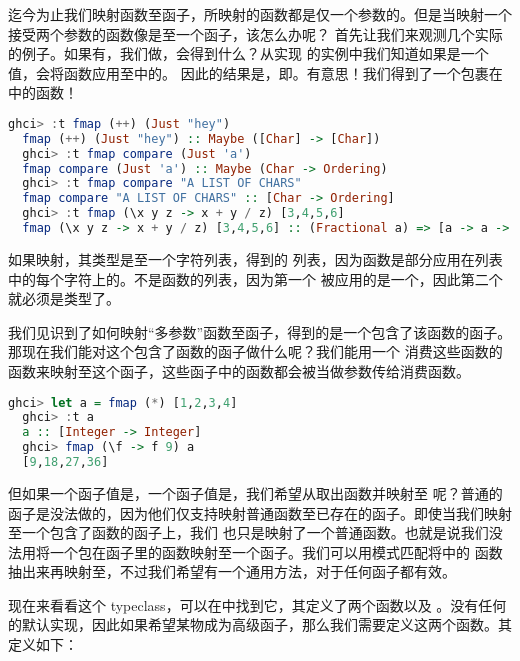 \documentclass[./main.tex]{subfiles}
\begin{document}
迄今为止我们映射函数至函子，所映射的函数都是仅一个参数的。但是当映射一个接受两个参数的函数像是\acode{*}至一个函子，该怎么办呢？
首先让我们来观测几个实际的例子。如果有，我们做，会得到什么？从实现
的实例中我们知道如果是一个值，会将函数应用至中的。
因此的结果是，即。有意思！我们得到了一个包裹在
中的函数！

\begin{lstlisting}[language=Haskell]
  ghci> :t fmap (++) (Just "hey")
  fmap (++) (Just "hey") :: Maybe ([Char] -> [Char])
  ghci> :t fmap compare (Just 'a')
  fmap compare (Just 'a') :: Maybe (Char -> Ordering)
  ghci> :t fmap compare "A LIST OF CHARS"
  fmap compare "A LIST OF CHARS" :: [Char -> Ordering]
  ghci> :t fmap (\x y z -> x + y / z) [3,4,5,6]
  fmap (\x y z -> x + y / z) [3,4,5,6] :: (Fractional a) => [a -> a -> a]
\end{lstlisting}

如果映射，其类型是至一个字符列表，得到的
列表，因为函数是部分应用在列表中的每个字符上的。不是函数的列表，因为第一个
被应用的是一个，因此第二个就必须是类型了。

我们见识到了如何映射“多参数”函数至函子，得到的是一个包含了该函数的函子。那现在我们能对这个包含了函数的函子做什么呢？我们能用一个
消费这些函数的函数来映射至这个函子，这些函子中的函数都会被当做参数传给消费函数。

\begin{lstlisting}[language=Haskell]
  ghci> let a = fmap (*) [1,2,3,4]
  ghci> :t a
  a :: [Integer -> Integer]
  ghci> fmap (\f -> f 9) a
  [9,18,27,36]
\end{lstlisting}

但如果一个函子值是，一个函子值是，我们希望从取出函数并映射至
呢？普通的函子是没法做的，因为他们仅支持映射普通函数至已存在的函子。即使当我们映射至一个包含了函数的函子上，我们
也只是映射了一个普通函数。也就是说我们没法用将一个包在函子里的函数映射至一个函子。我们可以用模式匹配将中的
函数抽出来再映射至，不过我们希望有一个通用方法，对于任何函子都有效。

现在来看看这个 typeclass，可以在中找到它，其定义了两个函数以及
\acode{<*>}。没有任何的默认实现，因此如果希望某物成为高级函子，那么我们需要定义这两个函数。其定义如下：
\end{document}

